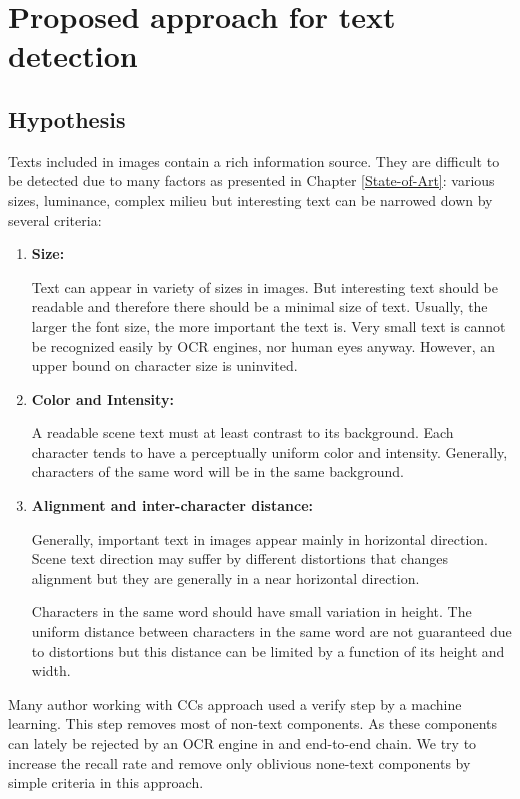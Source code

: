    
\graphicspath{ {4chapterOurApproach/image/} }
\chapter{Proposed approach for text detection} \label{Approach}
\section{Hypothesis}
\par
Texts included in images contain a rich information source. They are difficult to be detected due to many factors as presented in Chapter \ref{State-of-Art}: various sizes, luminance, complex milieu but interesting text can be narrowed down by several criteria:
\begin{enumerate}
\item {\textbf{Size:}}
\par
Text can appear in variety of sizes in images. But interesting text should be readable and therefore there should be a minimal size of text. Usually, the larger the font size, the more important the text is. Very small text is cannot be recognized easily by OCR engines, nor human eyes anyway. However, an upper bound on character size is uninvited.
\item {\textbf{Color and Intensity:}}
\par
A readable scene text must at least contrast to its background. Each character tends to have a perceptually uniform color and intensity. Generally, characters of the same word will be in the same background.
\item {\textbf{Alignment and inter-character distance:}}
\par
Generally, important text in images appear mainly in horizontal direction. Scene text direction may suffer by different distortions that changes alignment but they are generally in a near horizontal direction. 
\par
Characters in the same word should have small variation in height. The uniform distance between characters in the same word are not guaranteed due to distortions but this distance can be limited by a function of its height and width. 
\end{enumerate}
\par
Many author working with CCs approach used a verify step by a machine learning. This step removes most of non-text components. As these components can lately be rejected by an OCR engine in and end-to-end chain. We try to increase the recall rate and remove only oblivious none-text components by simple criteria in this approach.
